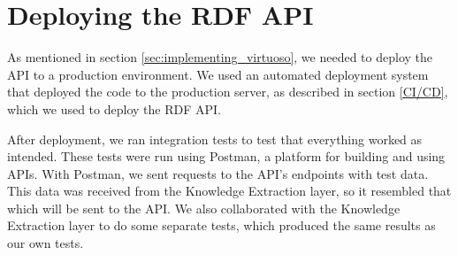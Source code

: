 \section{Deploying the RDF API}
As mentioned in section \ref{sec:implementing_virtuoso}, we needed to deploy the API to a production environment.
We used an automated deployment system that deployed the code to the production server, as described in section \ref{CI/CD}, which we used to deploy the RDF API.

After deployment, we ran integration tests to test that everything worked as intended. These tests were run using Postman, a platform for building and using APIs\cite{PostmanAPIPlatform}. With Postman, we sent requests to the API's endpoints with \knox{} test data. This data was received from the Knowledge Extraction layer, so it resembled that which will be sent to the API.
We also collaborated with the Knowledge Extraction layer to do some separate tests, which produced the same results as our own tests.

